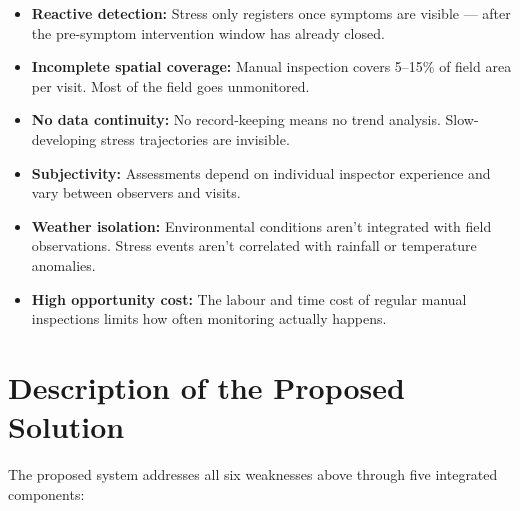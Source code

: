 \documentclass[12pt,a4paper]{report}
\begin{document}
\begin{itemize}
  \item \textbf{Reactive detection:} Stress only registers once symptoms are visible — after the pre-symptom intervention window has already closed.
  \item \textbf{Incomplete spatial coverage:} Manual inspection covers 5--15\% of field area per visit. Most of the field goes unmonitored.
  \item \textbf{No data continuity:} No record-keeping means no trend analysis. Slow-developing stress trajectories are invisible.
  \item \textbf{Subjectivity:} Assessments depend on individual inspector experience and vary between observers and visits.
  \item \textbf{Weather isolation:} Environmental conditions aren't integrated with field observations. Stress events aren't correlated with rainfall or temperature anomalies.
  \item \textbf{High opportunity cost:} The labour and time cost of regular manual inspections limits how often monitoring actually happens.
\end{itemize}

\section{Description of the Proposed Solution}

The proposed system addresses all six weaknesses above through five integrated components:
\end{document}
